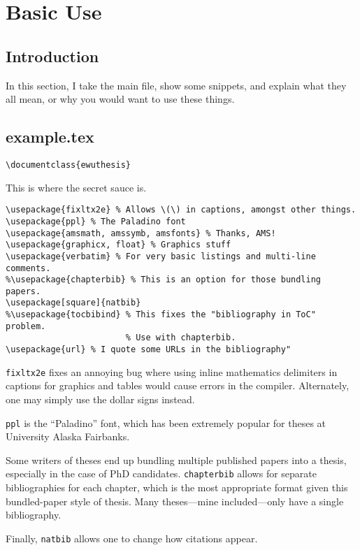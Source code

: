 \chapter{Basic Use}

\section{Introduction}

In this section, I take the main file, show some snippets, and explain what
they all mean, or why you would want to use these things.

\section{example.tex}

\begin{verbatim}
\documentclass{ewuthesis}
\end{verbatim}

This is where the secret sauce is.

\begin{verbatim}
\usepackage{fixltx2e} % Allows \(\) in captions, amongst other things.
\usepackage{ppl} % The Paladino font
\usepackage{amsmath, amssymb, amsfonts} % Thanks, AMS!
\usepackage{graphicx, float} % Graphics stuff
\usepackage{verbatim} % For very basic listings and multi-line comments.
%\usepackage{chapterbib} % This is an option for those bundling papers.
\usepackage[square]{natbib}
%\usepackage{tocbibind} % This fixes the "bibliography in ToC" problem.
                        % Use with chapterbib.
\usepackage{url} % I quote some URLs in the bibliography"
\end{verbatim}

\texttt{fixltx2e} fixes an annoying bug where using inline mathematics
delimiters in captions for graphics and tables would cause errors in the
compiler. Alternately, one may simply use the dollar signs instead.

\texttt{ppl} is the ``Paladino'' font, which has been extremely popular for
theses at University Alaska Fairbanks.

Some writers of theses end up bundling multiple published papers into a thesis,
especially in the case of PhD candidates. \texttt{chapterbib} allows for
separate bibliographies for each chapter, which is the most appropriate format
given this bundled-paper style of thesis. Many theses---mine included---only
have a single bibliography.

Finally, \texttt{natbib} allows one to change how citations appear.

